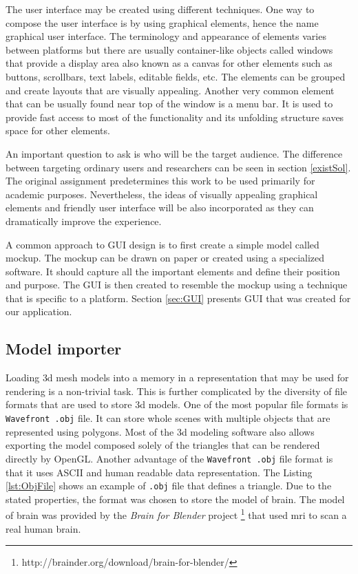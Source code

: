 The user interface may be created using different techniques. One way to compose the user interface is by using graphical elements, hence the name graphical user interface. The terminology and appearance of elements varies between platforms but there are usually container-like objects called windows that provide a display area also known as a canvas for other elements such as buttons, scrollbars, text labels, editable fields, etc. The elements can be grouped and create layouts that are visually appealing. Another very common element that can be usually found near top of the window is a menu bar. It is used to provide fast access to most of the functionality and its unfolding structure saves space for other elements. 

An important question to ask is who will be the target audience. The difference between targeting ordinary users and researchers can be seen in section \ref{existSol}. The original assignment predetermines this work to be used primarily for academic purposes. Nevertheless, the ideas of visually appealing graphical elements and friendly user interface will be also incorporated as they can dramatically improve the experience.

A common approach to GUI design is to first create a simple model called mockup. The mockup can be drawn on paper or created using a specialized software. It should capture all the important elements and define their position and purpose. The GUI is then created to resemble the mockup using a technique that is specific to a platform. Section \ref{sec:GUI} presents GUI that was created for our application. 

\subsection{Model importer}
Loading \gls{3d} mesh models into a memory in a representation that may be used for rendering is a non-trivial task. This is further complicated by the diversity of file formats that are used to store \gls{3d} models. One of the most popular file formats is \texttt{Wavefront .obj} file. It can store whole scenes with multiple objects that are represented using polygons. Most of the \gls{3d} modeling software also allows exporting the model composed solely of the triangles that can be rendered directly by OpenGL. Another advantage of the \texttt{Wavefront .obj} file format is that it uses ASCII and human readable data representation. The Listing \ref{lst:ObjFile} shows an example of \texttt{.obj} file that defines a triangle. Due to the stated properties, the format was chosen to store the model of brain. The model of brain was provided by the \emph{Brain for Blender} project \footnote{http://brainder.org/download/brain-for-blender/} that used \gls{mri} to scan a real human brain.

